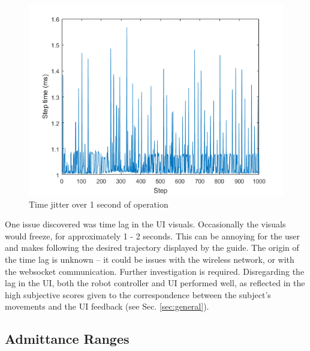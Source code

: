 \documentclass[12pt]{report}
\begin{document}
\begin{figure}[t] 
	\centering
	\includegraphics[width=0.9\linewidth]{time_jitter}
	\caption{Time jitter over 1 second of operation}
	\label{fig:jitter}
\end{figure}

One issue discovered was time lag in the UI visuals. Occasionally the visuals would freeze, for approximately 1 - 2 seconds. This can be annoying for the user and makes following the desired trajectory displayed by the guide. The origin of the time lag is unknown -- it could be issues with the wireless network, or with the websocket communication. Further investigation is required. Disregarding the lag in the UI, both the robot controller and UI performed well, as reflected in the high subjective scores given to the correspondence between the subject's movements and the UI feedback (see Sec. \ref{sec:general}). 

	
	\subsection{Admittance Ranges}
	
	
	\setlength\arrayrulewidth{1pt}	
	
\end{document}
